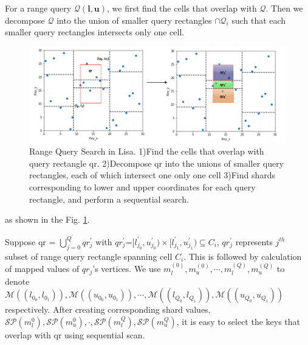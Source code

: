 For a range query $\mathcal{Q}(\boldsymbol{l},\boldsymbol{u})$, we first find the cells that overlap with $\mathcal{Q}$. Then we decompose $\mathcal{Q}$ into the union of smaller query rectangles $\cap \mathcal{Q}_i$ such that each smaller query rectangles intersects only one cell.

\begin{figure}[t]
    \centering
    \includegraphics[width=1\textwidth]{graphs/range_query_lisa.png}
    \caption{Range Query Search in Lisa.
    1)Find the cells that overlap with query rectangle qr.    2)Decompose qr into the unions of smaller query rectangles, each of which intersect one only one cell    3)Find shards corresponding to lower and upper coordinates for each query rectangle, and perform a sequential search. }
    \label{fig:Range_Query_Lisa}
\end{figure}

 as shown in the Fig. \ref{fig:Range_Query_Lisa}. 
 
 Suppose qr = $\bigcup\limits_{j=0}^{Q^{'}}qr_{j}^{'}$ with $qr_{j}^{'}$=$[l_{j_0}^{'},u_{j_0}^{'})\times[l_{j_1}^{'},u_{j_1}^{'}) \subseteq C_{i}$, $qr_{j}^{'}$ represents $j^{th}$ subset of range query rectangle spanning cell $C_{i}$. This is followed by calculation of mapped values of 
$qr_{j}$'s vertices. We use $m_{l}^{(0)}, m_{u}^{(0)},\cdots,m_{l}^{(Q)}, m_{u}^{(Q)}$ to denote $\mathcal{M}((l_{0_0},l_{0_1} )), \mathcal{M}((u_{0_0},u_{0_1} )), \cdots, \mathcal{M}((l_{Q_0},l_{Q_1} )), \mathcal{M}((u_{Q_0},u_{Q_1} ))$ respectively. After creating corresponding shard values,  $\mathcal{SP}(m_{l}^{0}), \mathcal{SP}(m_{u}^{0}), \cdot, \mathcal{SP}(m_{l}^{Q}), \mathcal{SP}(m_{u}^{Q})$, it is easy to select the keys that overlap with qr using sequential scan.

